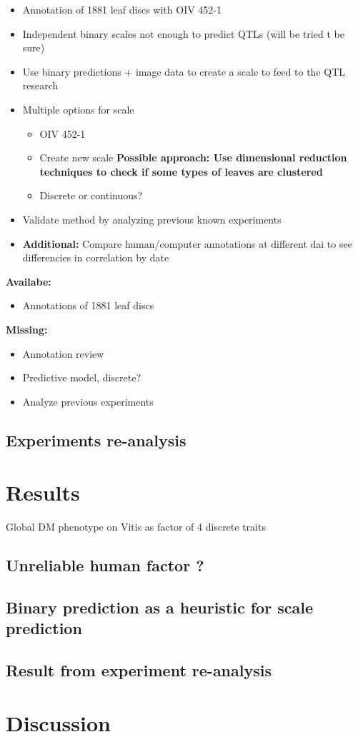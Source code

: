 \documentclass[english]{article}
\begin{document}
\begin{itemize}
	\item Annotation of 1881 leaf discs with OIV 452-1
	\item Independent binary scales not enough to predict QTLs (will be tried t be sure)
	\item Use binary predictions + image data to create a scale to feed to the QTL research
	\item Multiple options for scale
	      \begin{itemize}
		      \item OIV 452-1
		      \item Create new scale \textbf{Possible approach: Use dimensional reduction techniques to check if some types of leaves are clustered}
		      \item Discrete or continuous?
	      \end{itemize}
	\item Validate method by analyzing previous known experiments
	\item \textbf{Additional:} Compare human/computer annotations at different dai to see differencies in correlation by date
\end{itemize}

\textbf{Availabe:}
\begin{itemize}
	\item Annotations of 1881 leaf discs
\end{itemize}
\textbf{Missing:}
\begin{itemize}
	\item Annotation review
	\item Predictive model, discrete?
	\item Analyze previous experiments
\end{itemize}

\subsection{Experiments re-analysis}

\section{Results}

Global DM phenotype on Vitis as factor of 4 discrete traits



\subsection{Unreliable human factor \textbf{?}}

\subsection{Binary prediction as a heuristic for scale prediction}

\subsection{Result from experiment re-analysis}


\section{Discussion}



\printbibliography
\end{document}
